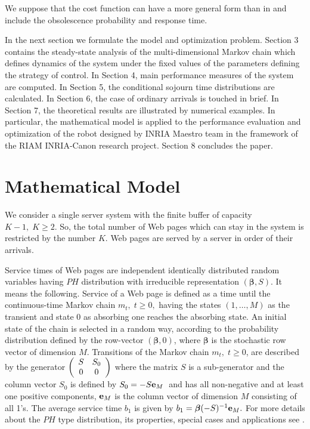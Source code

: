 \documentclass[11pt]{article}
\begin{document}
We suppose that the cost function can have a more general form 
than in \cite{tlnc} and include the obsolescence probability and 
response time.

In the next section we formulate the model and optimization problem.
Section 3 contains the steady-state analysis of the
multi-dimensional Markov chain which defines dynamics of the system
under the fixed values of the parameters defining the strategy of
control. In Section 4, main performance measures of the system are
computed. In Section 5, the conditional sojourn time distributions
are calculated. In Section 6, the case of ordinary arrivals is touched in brief.
In Section 7, the theoretical results are illustrated by numerical examples.
In particular, the mathematical model is applied to the performance evaluation
and optimization of the robot designed by INRIA Maestro team in the
framework of the RIAM INRIA-Canon research project.
Section 8 concludes the paper.



\section{Mathematical Model}

We consider a single server system with the finite buffer of
capacity $K-1, \; K \ge 2.$ So, the total number of Web pages which
can stay in the system is restricted by the number $K.$ Web pages
are served by a server in order of their arrivals.

Service times of Web pages are independent identically distributed
random variables having $PH$ distribution with irreducible
representation $({\boldsymbol \beta}, S).$ It means the following.
Service of a Web page is defined as a time until the continuous-time
Markov chain $m_t,\; t \ge 0,$ having the states $(1,\dots,M)$ as
the transient and state $0$ as absorbing one reaches the absorbing
state. An initial state of the chain is selected in a random way,
according to the probability distribution defined by the row-vector
$({\boldsymbol \beta},0)$, where ${\boldsymbol \beta}$ is the
stochastic row vector of dimension $M$. Transitions of the Markov
chain $m_t,\;t \geq 0$, are described by the generator $ \left(
\begin{array}{cc}
 S&S_0\cr 0&0
\end{array}
\right)$
where the matrix $S$ is a sub-generator and the column
vector $S_0$ is defined by $S_0=-S{\bf e}_M\;$ and has all
non-negative and at least one positive components, ${\bf e}_M$ is
the column vector of dimension $M$ consisting of all 1's.
 The average service time $b_1$ is given by $b_1={\boldsymbol
\beta}(-S)^{-1}{\bf e}_M.$
For more details about the $PH$ type distribution, its properties,
special cases and applications see \cite{n81,pp}. 
\end{document}
